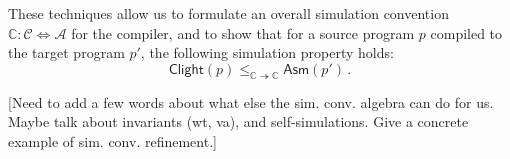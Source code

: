 \documentclass[acmsmall,authordraft]{acmart}
\newcommand{\kw}[1]{\ensuremath{ \mathsf{#1} }}
\begin{document}
These techniques allow us to formulate an overall
simulation convention
$\mathbb{C} : \mathcal{C} \Leftrightarrow \mathcal{A}$
for the compiler, %
and to show that for a source program $p$
compiled to the target program $p'$,
the following simulation property holds:
\[
    \kw{Clight}(p)
    \le_{\mathbb{C} \twoheadrightarrow \mathbb{C}}
    \kw{Asm}(p') \,.
\]

[Need to add a few words about what else the sim. conv. algebra
can do for us.
Maybe talk about invariants (wt, va),
and self-simulations.
Give a concrete example of sim. conv. refinement.]



\end{document}
